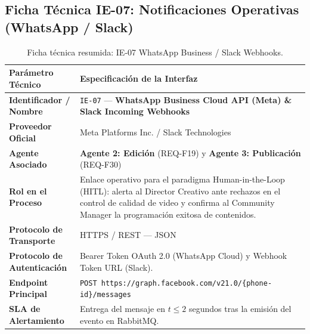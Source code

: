 \documentclass[11pt,a4paper]{article}
\begin{document}
\subsection{Ficha Técnica IE-07: Notificaciones Operativas (WhatsApp / Slack)}\label{sec:ie07}
\begin{table}[h!]
\centering
\small
\begin{tabular}{p{4.5cm} p{11cm}}
\toprule
\textbf{Parámetro Técnico} & \textbf{Especificación de la Interfaz} \\
\midrule
\textbf{Identificador / Nombre} & \texttt{IE-07} --- \textbf{WhatsApp Business Cloud API (Meta) \& Slack Incoming Webhooks} \\
\textbf{Proveedor Oficial} & Meta Platforms Inc. / Slack Technologies \\
\textbf{Agente Asociado} & \textbf{Agente 2: Edición} (REQ-F19) y \textbf{Agente 3: Publicación} (REQ-F30) \\
\textbf{Rol en el Proceso} & Enlace operativo para el paradigma Human-in-the-Loop (HITL): alerta al Director Creativo ante rechazos en el control de calidad de video y confirma al Community Manager la programación exitosa de contenidos. \\
\textbf{Protocolo de Transporte} & HTTPS / REST --- JSON \\
\textbf{Protocolo de Autenticación} & Bearer Token OAuth 2.0 (WhatsApp Cloud) y Webhook Token URL (Slack). \\
\textbf{Endpoint Principal} & \texttt{POST https://graph.facebook.com/v21.0/\{phone-id\}/messages} \\
\textbf{SLA de Alertamiento} & Entrega del mensaje en $t \le 2$ segundos tras la emisión del evento en RabbitMQ. \\
\bottomrule
\end{tabular}
\caption{Ficha técnica resumida: IE-07 WhatsApp Business / Slack Webhooks.}
\end{table}
\end{document}
